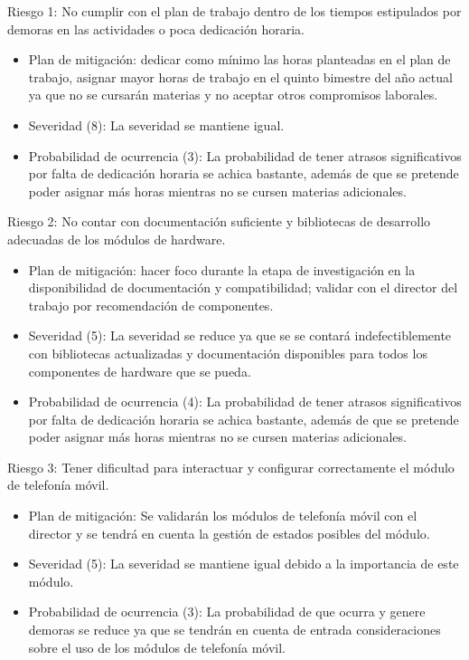 \documentclass[
11pt, %
]{charter}
\begin{document}
Riesgo 1: No cumplir con el plan de trabajo dentro de los tiempos estipulados por demoras en las actividades o poca dedicación horaria.
\begin{itemize}
	\item Plan de mitigación: dedicar como mínimo las horas planteadas en el plan de trabajo, asignar mayor horas de trabajo en el quinto bimestre del año actual ya que no se cursarán materias y no aceptar otros compromisos laborales.
	\item Severidad (8): La severidad se mantiene igual.
	\item Probabilidad de ocurrencia (3): La probabilidad de tener atrasos significativos por falta de dedicación horaria se achica bastante, además de que se pretende poder asignar más horas mientras no se cursen materias adicionales.
\end{itemize}

Riesgo 2: No contar con documentación suficiente y bibliotecas de desarrollo adecuadas de los módulos de hardware.
\begin{itemize}
	\item Plan de mitigación: hacer foco durante la etapa de investigación en la disponibilidad de documentación y compatibilidad; validar con el director del trabajo por recomendación de componentes.
	\item Severidad (5): La severidad se reduce ya que se se contará indefectiblemente con bibliotecas actualizadas y documentación disponibles para todos los componentes de hardware que se pueda.
	\item Probabilidad de ocurrencia (4): La probabilidad de tener atrasos significativos por falta de dedicación horaria se achica bastante, además de que se pretende poder asignar más horas mientras no se cursen materias adicionales.
\end{itemize}
 
Riesgo 3: Tener dificultad para interactuar y configurar correctamente el módulo de telefonía móvil.
\begin{itemize}
	\item Plan de mitigación: Se validarán los módulos de telefonía móvil con el director y se tendrá en cuenta la gestión de estados posibles del módulo.
	\item Severidad (5):  La severidad se mantiene igual debido a la importancia de este módulo.
	\item Probabilidad de ocurrencia (3): La probabilidad de que ocurra y genere demoras se reduce ya que se tendrán en cuenta de entrada consideraciones sobre el uso de los módulos de telefonía móvil.
\end{itemize}
\end{document}
